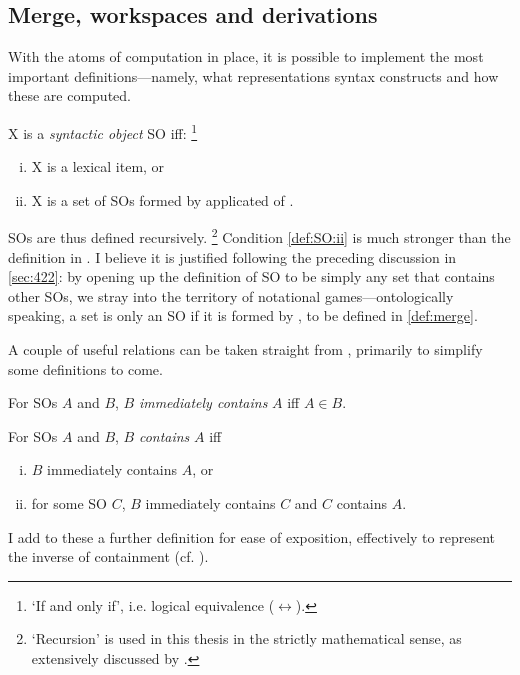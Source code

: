 \subsection{Merge, workspaces and derivations}\label{sec:430}

With the atoms of computation in place, it is possible to implement the most important definitions---namely, what representations syntax constructs and how these are computed.

\begin{definition}\label{def:SO}
    X is a \textit{syntactic object} SO iff:%
    \footnote{`If and only if', i.e. logical equivalence ($\leftrightarrow$).}%
    \begin{enumerate}[(i)]
        \item\label{def:SO:i}
            X is a lexical item, or
        \item\label{def:SO:ii}
            X is a set of SOs formed by applicated of \Merge.
    \end{enumerate}
\end{definition}
\noindent
SOs are thus defined recursively.%
\footnote{`Recursion' is used in this thesis in the strictly mathematical sense, as extensively discussed by \textcite{WatumullJ.etal_2014a}.}
Condition \ref{def:SO:ii} is much stronger than the definition in \CS. I believe it is justified following the preceding discussion in \autoref{sec:422}: by opening up the definition of SO to be simply any set that contains other SOs, we stray into the territory of notational games---ontologically speaking, a set is only an SO if it is formed by \Merge, to be defined in \autoref{def:merge}.

A couple of useful relations can be taken straight from \CS, primarily to simplify some definitions to come.

\begin{definition}
    For SOs $A$ and $B$, $B$ \textit{immediately contains} $A$ iff $A \in B$.
\end{definition}

\begin{definition}
    For SOs $A$ and $B$, $B$ \textit{contains} $A$ iff
    \begin{enumerate}[(i)]
        \item $B$ immediately contains $A$, or
        \item for some SO $C$, $B$ immediately contains $C$ and $C$ contains $A$.
    \end{enumerate}
\end{definition}
\noindent
I add to these a further definition for ease of exposition, effectively to represent the inverse of containment (cf. ).

